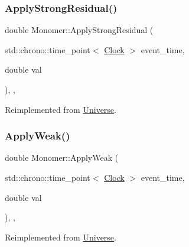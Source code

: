 \mbox{\label{classMonomer_a921f7add2d446b8670513220ace6c4b2}} 
\subsubsection{\texorpdfstring{Apply\+Strong\+Residual()}{ApplyStrongResidual()}}
{\footnotesize\ttfamily double Monomer\+::\+Apply\+Strong\+Residual (\begin{DoxyParamCaption}\item[{std\+::chrono\+::time\+\_\+point$<$ \mbox{\hyperlink{universe_8h_a0ef8d951d1ca5ab3cfaf7ab4c7a6fd80}{Clock}} $>$}]{event\+\_\+time,  }\item[{double}]{val }\end{DoxyParamCaption})\hspace{0.3cm}{\ttfamily [inline]}, {\ttfamily [final]}, {\ttfamily [virtual]}}



Reimplemented from \mbox{\hyperlink{classUniverse_af7becebb347be9a85541d96a3eca1ca7}{Universe}}.

\mbox{\label{classMonomer_a176a1a4dfed1eaddc6637bbfd2660aba}} 
\subsubsection{\texorpdfstring{Apply\+Weak()}{ApplyWeak()}}
{\footnotesize\ttfamily double Monomer\+::\+Apply\+Weak (\begin{DoxyParamCaption}\item[{std\+::chrono\+::time\+\_\+point$<$ \mbox{\hyperlink{universe_8h_a0ef8d951d1ca5ab3cfaf7ab4c7a6fd80}{Clock}} $>$}]{event\+\_\+time,  }\item[{double}]{val }\end{DoxyParamCaption})\hspace{0.3cm}{\ttfamily [inline]}, {\ttfamily [final]}, {\ttfamily [virtual]}}



Reimplemented from \mbox{\hyperlink{classUniverse_a6d1226b3adec3c42a833afdbb6a65a92}{Universe}}.

\mbox{\label{classMonomer_a64f65c128ebc2428c42739c930696ea1}} 
